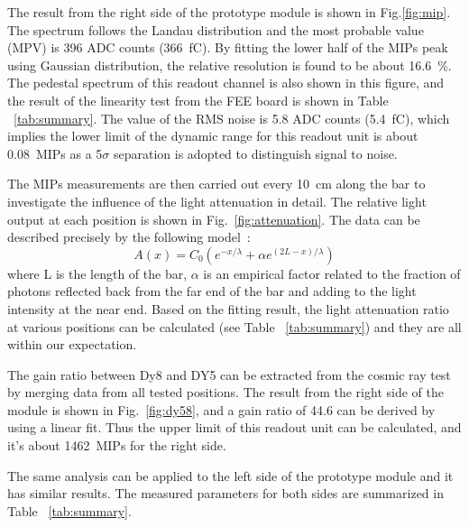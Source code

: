 \documentclass[preprint, times]{elsarticle}
\begin{document}
The result from the right side of the prototype module is shown in Fig.\ref{fig:mip}.
The spectrum follows the Landau distribution and the most probable value (MPV) is 396 ADC counts (\SI{366}{\femto\coulomb}).
By fitting the lower half of the MIPs peak using Gaussian distribution, the relative resolution is found to be about \SI{16.6}{\percent}.
The pedestal spectrum of this readout channel is also shown in this figure, and the result of the linearity test from the FEE board is shown in Table ~\ref{tab:summary}. The value of the RMS noise is 5.8 ADC counts (\SI{5.4}{\femto\coulomb}), which implies the lower limit of the dynamic range for this readout unit is about \SI{0.08}{MIPs} as a 5$\sigma$ separation is adopted to distinguish signal to noise.

The MIPs measurements are then carried out every \SI{10}{\centi\meter} along the bar to investigate the influence of the light attenuation in detail.
The relative light output at each position is shown in Fig.~\ref{fig:attenuation}.
The data can be described precisely by the following model~\cite{taiuti_measurement_1996}:
\begin{equation}
A(x)=C_0(e^{-x/\lambda} + \alpha e^{(2L-x)/\lambda})
\end{equation}
where L is the length of the bar, $\alpha$ is an empirical factor related to the fraction of photons reflected back from the far end of the bar and adding to the light intensity at the near end.
Based on the fitting result, the light attenuation ratio at various positions can be calculated (see Table ~\ref{tab:summary}) and they are all within our expectation.

The gain ratio between Dy8 and DY5 can be extracted from the cosmic ray test by merging data from all tested positions.
The result from the right side of the module is shown in Fig.~\ref{fig:dy58}, and a gain ratio of 44.6 can be derived by using a linear fit. Thus the upper limit of this readout unit can be calculated, and it's about  \SI{1462}{MIPs} for the right side.

The same analysis can be applied to the left side of the prototype module and it has similar results. The measured parameters for both sides are summarized in Table ~\ref{tab:summary}.
\end{document}
